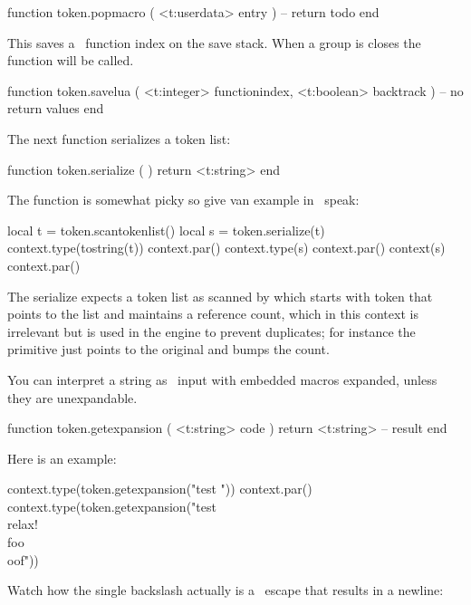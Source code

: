 \starttyping[option=LUA]
function token.popmacro ( <t:userdata> entry )
    -- return todo
end
\stoptyping

This saves a \LUA\ function index on the save stack. When a group is closes the
function will be called.

\starttyping[option=LUA]
function token.savelua ( <t:integer> functionindex, <t:boolean> backtrack )
    -- no return values
end
\stoptyping

The next function serializes a token list:

\starttyping[option=LUA]
function token.serialize ( )
    return <t:string>
end
\stoptyping

The function is somewhat picky so give van example in \CONTEXT\ speak:

\startbuffer
\startluacode
    local t = token.scantokenlist()
    local s = token.serialize(t)
    context.type(tostring(t)) context.par()
    context.type(s)           context.par()
    context(s)                context.par()
\stopbuffer

\typebuffer

The serialize expects a token list as scanned by  which
starts with token that points to the list and maintains a reference count, which
in this context is irrelevant but is used in the engine to prevent duplicates;
for instance the \type {\let} primitive just points to the original and bumps the
count.

\startlines
\getbuffer
\stoplines

You can interpret a string as \TEX\ input with embedded macros expanded, unless
they are unexpandable.

\starttyping[option=LUA]
function token.getexpansion ( <t:string> code )
    return <t:string> -- result
end
\stoptyping

Here is an example:

\startbuffer
          \def\foo{foo}
\protected{}

\startluacode
context.type(token.getexpansion("test \relax"))
context.par()
context.type(token.getexpansion("test \\relax{!} \\foo\\oof"))
\stopluacode
\stopbuffer

\typebuffer

Watch how the single backslash actually is a \LUA\ escape that results in
a newline:

\startlines
\getbuffer
\stoplines

